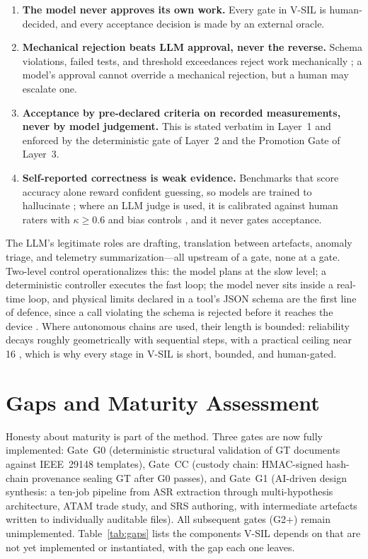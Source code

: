 \documentclass[11pt,a4paper]{article}
\begin{document}
\begin{enumerate}[label=\textbf{G\arabic*.}]
  \item \textbf{The model never approves its own work.} Every gate in V-SIL is human-decided,
    and every acceptance decision is made by an external oracle.
  \item \textbf{Mechanical rejection beats LLM approval, never the reverse.} Schema violations,
    failed tests, and threshold exceedances reject work mechanically
    \cite{mcp2025,tooluse2026}; a model's approval cannot override a mechanical rejection, but a
    human may escalate one.
  \item \textbf{Acceptance by pre-declared criteria on recorded measurements, never by model
    judgement.} This is stated verbatim in Layer~1 and enforced by the deterministic gate of
    Layer~2 and the Promotion Gate of Layer~3.
  \item \textbf{Self-reported correctness is weak evidence.} Benchmarks that score accuracy alone
    reward confident guessing, so models are trained to hallucinate \cite{kalai2026}; where an
    LLM judge is used, it is calibrated against human raters with $\kappa \geq 0.6$ and bias
    controls \cite{futureagi2026,judge2026}, and it never gates acceptance.
\end{enumerate}

The LLM's legitimate roles are drafting, translation between artefacts, anomaly triage, and
telemetry summarization---all upstream of a gate, none at a gate. Two-level control operationalizes
this: the model plans at the slow level; a deterministic controller executes the fast loop; the
model never sits inside a real-time loop, and physical limits declared in a tool's JSON schema are
the first line of defence, since a call violating the schema is rejected before it reaches the
device \cite{tooluse2026,mcp2025}. Where autonomous chains are used, their length is bounded:
reliability decays roughly geometrically with sequential steps, with a practical ceiling near 16
\cite{mittal2026}, which is why every stage in V-SIL is short, bounded, and human-gated.

\section{Gaps and Maturity Assessment}
\label{sec:gaps}

Honesty about maturity is part of the method. Three gates are now fully implemented:
Gate~G0 (deterministic structural validation of GT documents against IEEE~29148 templates),
Gate~CC (custody chain: HMAC-signed hash-chain provenance sealing GT after G0 passes), and
Gate~G1 (AI-driven design synthesis: a ten-job pipeline from ASR extraction through
multi-hypothesis architecture, ATAM trade study, and SRS authoring, with intermediate
artefacts written to individually auditable files). All subsequent gates (G2+) remain
unimplemented.
Table~\ref{tab:gaps} lists the components V-SIL depends on that are not yet implemented or
instantiated, with the gap each one leaves.
\end{document}
